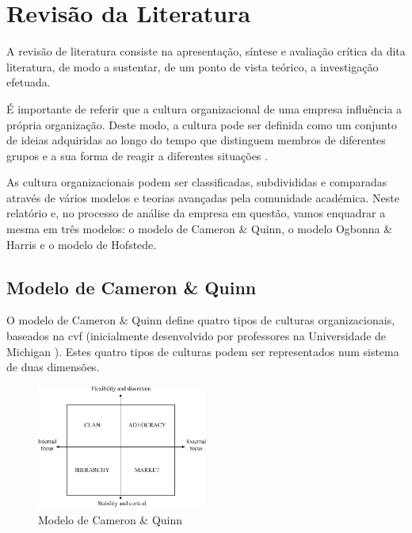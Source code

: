 
\section{Revisão da Literatura}

A revisão de literatura consiste na apresentação, síntese e avaliação crítica da dita literatura, de modo a sustentar, de um ponto de vista teórico, a investigação efetuada.

É importante de referir que a cultura organizacional de uma empresa influência a própria organização. Deste modo, a cultura pode ser definida como um conjunto de ideias adquiridas ao longo do tempo que distinguem membros de diferentes grupos e a sua forma de reagir a diferentes situações \parencite{Schein_1990,Ravasi_Schultz_2006}.

As cultura organizacionais podem ser classificadas, subdivididas e comparadas através de vários modelos e teorias avançadas pela comunidade académica. Neste relatório e, no processo de análise da empresa em questão, vamos enquadrar a mesma em três modelos: o modelo de Cameron \& Quinn, o modelo Ogbonna \& Harris e o modelo de Hofstede.

\subsection{Modelo de Cameron \& Quinn}

O modelo de Cameron \& Quinn \parencite{Cameron_Quinn_2011} define quatro tipos de culturas organizacionais, baseados na \acrfull{cvf} (inicialmente desenvolvido por professores na Universidade de Michigan \parencite{10.2307/3380029}). Estes quatro tipos de culturas podem ser representados num sistema de duas dimensões.

\begin{figure}[h]
\centering
\includegraphics[width=0.5\textwidth]{cvf}
\caption{Modelo de Cameron \& Quinn}
\end{figure}


